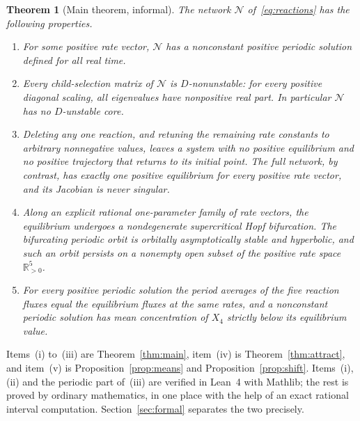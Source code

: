 \documentclass[11pt,a4paper]{article}
\theoremstyle{plain}
\newtheorem{theorem}{Theorem}[section]
\theoremstyle{definition}
\theoremstyle{remark}
\newcommand{\R}{\mathbb{R}}
\newcommand{\Osc}{\mathcal{N}}
\begin{document}
\begin{theorem}[Main theorem, informal]\label{thm:informal}
The network $\Osc$ of~\eqref{eq:reactions} has the following properties.
\begin{enumerate}[label=\textup{(\roman*)}]
\item For some positive rate vector, $\Osc$ has a nonconstant positive periodic solution defined for all real time.
\item Every child-selection matrix of $\Osc$ is $D$-nonunstable: for every positive diagonal scaling, all eigenvalues have nonpositive real part. In particular $\Osc$ has no $D$-unstable core.
\item Deleting any one reaction, and retuning the remaining rate constants to arbitrary nonnegative values, leaves a system with no positive equilibrium and no positive trajectory that returns to its initial point. The full network, by contrast, has exactly one positive equilibrium for every positive rate vector, and its Jacobian is never singular.
\item Along an explicit rational one-parameter family of rate vectors, the equilibrium undergoes a nondegenerate supercritical Hopf bifurcation. The bifurcating periodic orbit is orbitally asymptotically stable and hyperbolic, and such an orbit persists on a nonempty open subset of the positive rate space $\R_{>0}^5$.
\item For every positive periodic solution the period averages of the five reaction fluxes equal the equilibrium fluxes at the same rates, and a nonconstant periodic solution has mean concentration of $X_4$ strictly below its equilibrium value.
\end{enumerate}
\end{theorem}

Items~(i) to~(iii) are Theorem~\ref{thm:main}, item~(iv) is Theorem~\ref{thm:attract}, and item~(v) is Proposition~\ref{prop:means} and Proposition~\ref{prop:shift}. Items~(i), (ii) and the periodic part of~(iii) are verified in Lean~4 with Mathlib; the rest is proved by ordinary mathematics, in one place with the help of an exact rational interval computation. Section~\ref{sec:formal} separates the two precisely.
\end{document}
